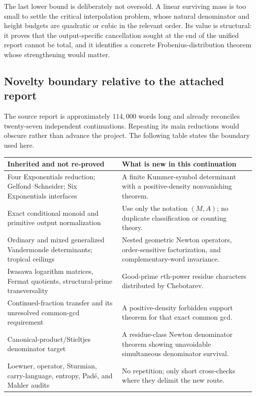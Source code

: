\documentclass[11pt,oneside]{article}
\theoremstyle{definition}
\theoremstyle{remark}
\begin{document}
The last lower bound is deliberately not oversold.  A linear surviving mass is too small to
settle the critical interpolation problem, whose natural denominator and height budgets are
quadratic or cubic in the relevant order.  Its value is structural: it proves that the
output-specific cancellation sought at the end of the unified report cannot be total, and it
identifies a concrete Frobenius-distribution theorem whose strengthening would matter.

\subsection{Novelty boundary relative to the attached report}

The source report is approximately $114{,}000$ words long and already reconciles twenty-seven
independent continuations.  Repeating its main reductions would obscure rather than advance
the project.  The following table states the boundary used here.

\begin{center}
\small
\begin{tabularx}{0.97\textwidth}{>{\raggedright\arraybackslash}p{}X}
\toprule
\textbf{Inherited and not re-proved} & \textbf{What is new in this continuation} \\
\midrule
Four Exponentials reduction; Gelfond--Schneider; Six Exponentials interfaces &
A finite Kummer-symbol determinant with a positive-density nonvanishing theorem. \\
Exact conditional monoid and primitive output normalization &
Use only the notation $(M,A)$; no duplicate classification or counting theory. \\
Ordinary and mixed generalized Vandermonde determinants; tropical ceilings &
Nested geometric Newton operators, order-sensitive factorization, and complementary-word invariance. \\
Iwasawa logarithm matrices, Fermat quotients, structural-prime transversality &
Good-prime $r$th-power residue characters distributed by Chebotarev. \\
Continued-fraction transfer and its unresolved common-gcd requirement &
A positive-density forbidden support theorem for that exact common gcd. \\
Canonical-product/Stieltjes denominator target &
A residue-class Newton denominator theorem showing unavoidable simultaneous denominator survival. \\
Loewner, operator, Sturmian, carry-language, entropy, Pad\'e, and Mahler audits &
No repetition; only short cross-checks where they delimit the new route. \\
\bottomrule
\end{tabularx}
\end{center}
\end{document}
